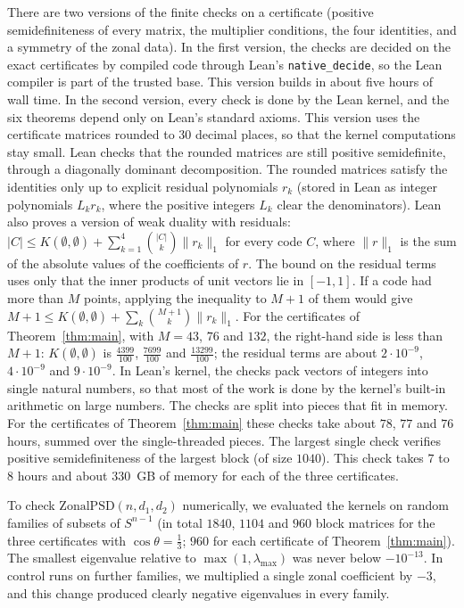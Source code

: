 \documentclass[11pt]{amsart}
\theoremstyle{remark}
\begin{document}
There are two versions of the finite checks on a certificate (positive semidefiniteness of every matrix, the multiplier conditions, the four identities, and a symmetry of the zonal data). In the first version, the checks are decided on the exact certificates by compiled code through Lean's \texttt{native\_decide}, so the Lean compiler is part of the trusted base. This version builds in about five hours of wall time. In the second version, every check is done by the Lean kernel, and the six theorems depend only on Lean's standard axioms. This version uses the certificate matrices rounded to $30$ decimal places, so that the kernel computations stay small. Lean checks that the rounded matrices are still positive semidefinite, through a diagonally dominant decomposition. The rounded matrices satisfy the identities only up to explicit residual polynomials $r_k$ (stored in Lean as integer polynomials $L_kr_k$, where the positive integers $L_k$ clear the denominators). Lean also proves a version of weak duality with residuals: $|C|\le K(\emptyset,\emptyset)+\sum_{k=1}^4\binom{|C|}{k}\|r_k\|_1$ for every code $C$, where $\|r\|_1$ is the sum of the absolute values of the coefficients of $r$. The bound on the residual terms uses only that the inner products of unit vectors lie in $[-1,1]$. If a code had more than $M$ points, applying the inequality to $M+1$ of them would give $M+1\le K(\emptyset,\emptyset)+\sum_k\binom{M+1}{k}\|r_k\|_1$. For the certificates of Theorem~\ref{thm:main}, with $M=43$, $76$ and $132$, the right-hand side is less than $M+1$: $K(\emptyset,\emptyset)$ is $\frac{4399}{100}$, $\frac{7699}{100}$ and $\frac{13299}{100}$; the residual terms are about $2\cdot10^{-9}$, $4\cdot10^{-9}$ and $9\cdot10^{-9}$. In Lean's kernel, the checks pack vectors of integers into single natural numbers, so that most of the work is done by the kernel's built-in arithmetic on large numbers. The checks are split into pieces that fit in memory. For the certificates of Theorem~\ref{thm:main} these checks take about $78$, $77$ and $76$ hours, summed over the single-threaded pieces. The largest single check verifies positive semidefiniteness of the largest block (of size $1040$). This check takes $7$ to $8$ hours and about $330$~GB of memory for each of the three certificates. %

To check $\mathrm{ZonalPSD}(n,d_1,d_2)$ numerically, we evaluated the kernels on random families of subsets of $S^{n-1}$ (in total $1840$, $1104$ and $960$ block matrices for the three certificates with $\cos\theta=\frac13$; $960$ for each certificate of Theorem~\ref{thm:main}). The smallest eigenvalue relative to $\max(1,\lambda_{\max})$ was never below $-10^{-13}$. In control runs on further families, we multiplied a single zonal coefficient by $-3$, and this change produced clearly negative eigenvalues in every family.
\end{document}
